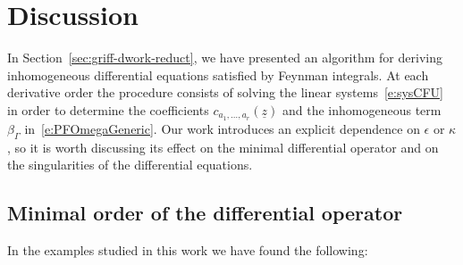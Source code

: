 \documentclass[a4paper,12pt]{article}
\numberwithin{equation}{section}
\numberwithin{figure}{section}
\begin{document}
\section{Discussion}
%
In Section~\ref{sec:griff-dwork-reduct}, we have presented an
algorithm for deriving inhomogeneous differential equations satisfied by Feynman
integrals. At each derivative order the
 procedure consists of solving the linear systems~\eqref{e:sysCFU} in order to
determine the coefficients $c_{a_1,\dots,a_r}(\underline z)$ and the 
inhomogeneous term $\beta_\Gamma$ in~\eqref{e:PFOmegaGeneric}. Our
work introduces an explicit dependence on $\epsilon$ or $\kappa$, so it is worth discussing  its effect on the minimal differential
operator and on the singularities of the differential equations.
%

\subsection{Minimal order of the differential operator}
\label{sec:minim-order-diff}

In the examples studied in this work we have found the following:
\end{document}
